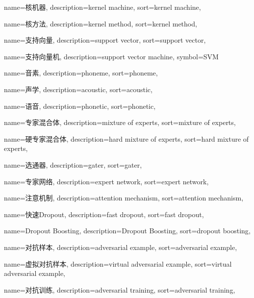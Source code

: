 {
  name=核机器,
  description={kernel machine},
  sort={kernel machine},
}

{
  name=核方法,
  description={kernel method},
  sort={kernel method},
}

{
  name=支持向量,
  description={support vector},
  sort={support vector},
}

{
  name=支持向量机,
  description={support vector machine},
  symbol={SVM}
}

{
  name=音素,
  description={phoneme},
  sort={phoneme},
}

{
  name=声学,
  description={acoustic},
  sort={acoustic},
}

{
  name=语音,
  description={phonetic},
  sort={phonetic},
}

{
  name=专家混合体,
  description={mixture of experts},
  sort={mixture of experts},
}

{
  name=硬专家混合体, %
  description={hard mixture of experts},
  sort={hard mixture of experts},
}

{
  name=选通器,
  description={gater},
  sort={gater},
}

{
  name=专家网络,
  description={expert network},
  sort={expert network},
}

{
  name=注意机制,
  description={attention mechanism},
  sort={attention mechanism},
}

{
  name=快速Dropout,
  description={fast dropout},
  sort={fast dropout},
}

{
  name=Dropout Boosting,
  description={Dropout Boosting},
  sort={dropout boosting},
}

{
  name=对抗样本,
  description={adversarial example},
  sort={adversarial example},
}

{
  name=虚拟对抗样本,
  description={virtual adversarial example},
  sort={virtual adversarial example},
}

{
  name=对抗训练,
  description={adversarial training},
  sort={adversarial training},
}

